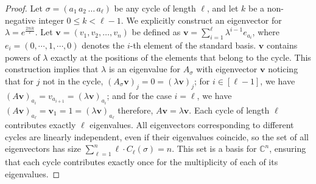 \documentclass[10pt,a4paper]{amsart}
\begin{document}
    \begin{proof}
        Let $\sigma = (a_1\,a_2\, \dots \, a_\ell)$ be any cycle of length $\ell$, and let $k$ be a non-negative integer $0 \le k < \ell-1$. We explicitly construct an eigenvector for $\lambda = e^{\frac{2 \pi i k}{\ell}}$. Let $\mathbf{v} = (v_1, v_2, \dots, v_n)$ be defined as $\mathbf{v} = \sum _{i = 1}^{\ell}\lambda ^ {i-1}e_{a_{i}}$, where $e_i = (0,\cdots ,1,\cdots ,0)$ denotes the $i$-th element of the standard basis. $\textbf{v}$ contains powers of $\lambda$ exactly at the positions of the elements that belong to the cycle.
        This construction implies that $\lambda$ is an eigenvalue for $A_\sigma$ with eigenvector $\mathbf{v}$ noticing that for $j$ not in the cycle, $(A_\sigma \mathbf{v})_j = 0 = (\lambda \mathbf{v})_j$; for $i \in [\ell-1]$, we have $(A\mathbf{v})_{a_{i}} = v_{a_{i+1}} = (\lambda \mathbf{v})_{a_i}$; and for the case $i = \ell$, we have $(A\mathbf{v})_{a_\ell} = \mathbf{v}_1 = 1 = (\lambda \mathbf{v})_{a_{\ell}}$ 
        therefore, $A\mathbf{v} = \lambda \mathbf{v}$.
        Each cycle of length $\ell$ contributes exactly $\ell$ eigenvalues. All eigenvectors corresponding to different cycles are linearly independent, even if their eigenvalues coincide, so the set of all eigenvectors has size $\sum _{\ell = 1}^n \ell \cdot C_{\ell}(\sigma) = n$. This set is a basis for $\mathbb{C}^n$, ensuring that each cycle contributes exactly once for the multiplicity of each of its eigenvalues.
    \end{proof}
\end{document}
